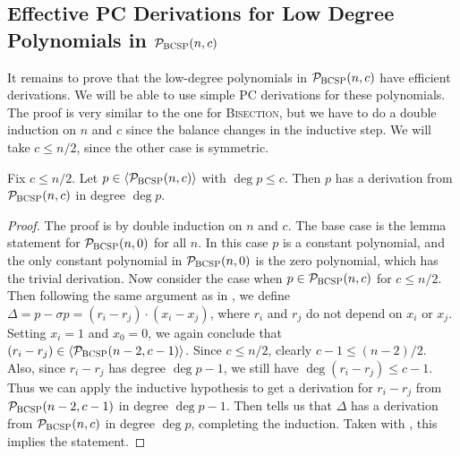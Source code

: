 \subsection{Effective PC Derivations for Low Degree Polynomials in $\mathcal P_{\textsc{BCSP}}(n,c)$}
It remains to prove that the low-degree polynomials in $\mathcal P_{\textsc{BCSP}}(n,c)$ have efficient derivations. We will be able to use simple PC derivations for these polynomials. The proof is very similar to the one for \textsc{Bisection}, but we have to do a double induction on $n$ and $c$ since the balance changes in the inductive step. We will take $c \leq n/2$, since the other case is symmetric.
\begin{lemma}\label{lem:lowdeg-easy}
Fix $c \leq n/2$. Let $p \in \langle \mathcal P_{\textsc{BCSP}}(n,c) \rangle$ with $\deg p \leq c$. Then $p$ has a derivation from $\mathcal P_{\textsc{BCSP}}(n,c)$ in degree $\deg p$. 
\end{lemma}
\begin{proof}
The proof is by double induction on $n$ and $c$. The base case is the lemma statement for $\mathcal P_{\textsc{BCSP}}(n,0)$ for all $n$. In this case $p$ is a constant polynomial, and the only constant polynomial in $\mathcal P_{\textsc{BCSP}}(n,0)$ is the zero polynomial, which has the trivial derivation. Now consider the case when $p \in \mathcal P_{\textsc{BCSP}}(n,c)$ for $c \leq n/2$. Then following the same argument as in , we define $\Delta = p - \sigma p = (r_i - r_j)\cdot (x_i - x_j)$, where $r_i$ and $r_j$ do not depend on $x_i$ or $x_j$. Setting $x_i = 1$ and $x_0 = 0$, we again conclude that $(r_i - r_j) \in \langle \mathcal P_{\textsc{BCSP}}(n-2,c-1) \rangle$. Since $c \leq n/2$, clearly $c-1 \leq (n-2)/2$. Also, since $r_i - r_j$ has degree $\deg p - 1$, we still have $\deg (r_i - r_j) \leq c-1$. Thus we can apply the inductive hypothesis to get a derivation for $r_i - r_j$ from $\mathcal P_{\textsc{BCSP}}(n-2,c-1)$ in degree $\deg p - 1$. Then  tells us that $\Delta$ has a derivation from $\mathcal P_{\textsc{BCSP}}(n,c)$ in degree $\deg p$, completing the induction. Taken with , this implies the statement. 
\end{proof}

